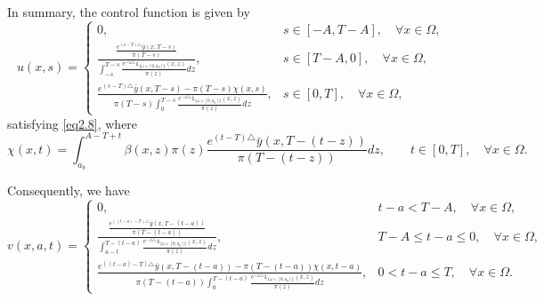 \documentclass[10pt, a4]{amsart}
\makeatletter
\theoremstyle{plain}
\theoremstyle{definition}
\theoremstyle{remark}
\renewenvironment{proof}[1][\proofname]{\par
  \pushQED{\qed}%
  \normalfont \topsep6\p@\@plus6\p@\relax
  \trivlist
  \item[\hskip\labelsep
        \itshape
    #1\ \ref{#1}.]\ignorespaces
}{%
  \popQED\endtrivlist\@endpefalse
}
\numberwithin{equation}{section}
\makeatother
\begin{document}
\begin{proof}[of Proposition \ref{pr2.3}]
In summary, the control function is given by  
\begin{equation}
u(x,s) =
\begin{cases}
0, & s \in [-A,T-A], \quad \forall x \in \Omega, \\
\frac{\frac{e^{(s-T)\triangle} \bar{y}(x,T-s)}{\pi(T-s)}}{\int_{-s}^{T-s} \frac{e^{-z\triangle} \mathds{1}_{\lbrace\omega\times[0,a_0]\rbrace}(x,z)}{\pi(z)} dz}, & s \in [T-A,0], \quad \forall x \in \Omega, \\
\frac{e^{(s-T)\triangle} \bar{y}(x,T-s) - \pi(T-s) \chi(x,s)}{\pi(T-s) \int_{0}^{T-s} \frac{e^{-z\triangle} \mathds{1}_{\lbrace\omega\times[0,a_0]\rbrace}(x,z)}{\pi(z)} dz}, & s \in [0,T], \quad \forall x \in \Omega,
\end{cases}
\end{equation}  
satisfying \eqref{eq2.8}, where  
\begin{equation}
\chi(x,t) = \int_{a_b}^{A-T+t} \beta(x,z) \pi(z) \frac{e^{(t-T)\triangle} \bar{y}(x,T-(t-z))}{\pi(T-(t-z))} dz, \qquad t \in [0,T], \quad \forall x \in \Omega.
\end{equation}  

Consequently, we have  
\begin{equation}
v(x,a,t) =
\begin{cases}
0, & t-a<T-A, \quad \forall x \in \Omega, \\
\frac{\frac{e^{((t-a)-T)\triangle} \bar{y}(x,T-(t-a))}{\pi(T-(t-a))}}{\int_{a-t}^{T-(t-a)} \frac{e^{-z\triangle} \mathds{1}_{\lbrace\omega\times[0,a_0]\rbrace}(x,z)}{\pi(z)} dz}, & T-A \leq t-a \leq 0, \quad \forall x \in \Omega, \\
\frac{e^{((t-a)-T)\triangle} \bar{y}(x,T-(t-a)) - \pi(T-(t-a)) \chi(x,t-a)}{\pi(T-(t-a)) \int_{0}^{T-(t-a)} \frac{e^{-z\triangle} \mathds{1}_{\lbrace\omega\times[0,a_0]\rbrace}(x,z)}{\pi(z)} dz}, & 0 < t-a \leq T, \quad \forall x \in \Omega.
\end{cases}
\end{equation}  


\end{proof}
\end{document}
